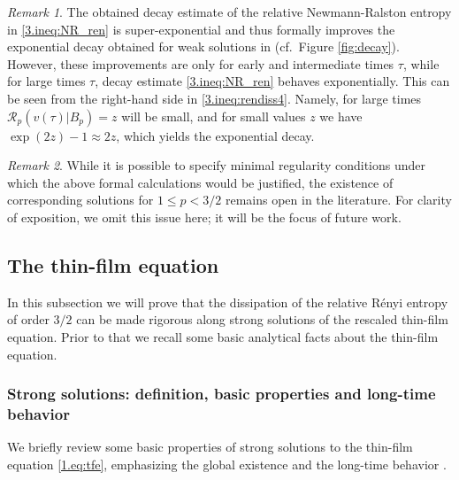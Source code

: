 \documentclass[12pt]{amsart}
\newcommand{\renyi}{{\mathcal{R}}}
\theoremstyle{plain}
\theoremstyle{definition}
\theoremstyle{remark}
\newtheorem{remark}{Remark}[section]
\begin{document}
\begin{remark}
The obtained decay estimate of the relative Newmann-Ralston entropy in \eqref{3.ineq:NR_ren} is super-exponential and thus formally improves the exponential decay obtained for weak solutions in \cite{MMS09} (cf.~Figure \ref{fig:decay}). However, these improvements are only for early and intermediate times $\tau$, while for large times $\tau$, decay estimate \eqref{3.ineq:NR_ren} behaves exponentially. This can be seen from the right-hand side in \eqref{3.ineq:rendiss4}. Namely, for large times $\renyi_p(v(\tau)|B_p) = z$ will be small, and for small values $z$ we have $\exp(2z)-1\approx 2z$, which yields the exponential decay.
\end{remark}
\begin{remark}
    While it is possible to specify minimal regularity conditions under which the above formal calculations would be justified, the existence of corresponding solutions for $1\leq p < 3/2$ remains open in the literature. For clarity of exposition, we omit this issue here; it will be the focus of future work.
\end{remark}

\subsection{The thin-film equation} \label{sec:thin-film}

In this subsection we will prove that the dissipation of the relative R\'enyi entropy of order $3/2$ can be made rigorous along strong solutions of the rescaled thin-film equation. Prior to that we recall some basic analytical facts about the thin-film equation.

\subsubsection{Strong solutions: definition, basic properties and long-time behavior}\label{sec:CaTo}
We briefly review some basic properties of strong solutions to the thin-film equation \eqref{1.eq:tfe}, emphasizing the global existence \cite{BBD95, Ber96, BePu96} and the long-time behavior \cite{Ber96, CaTo02}. 
\end{document}

